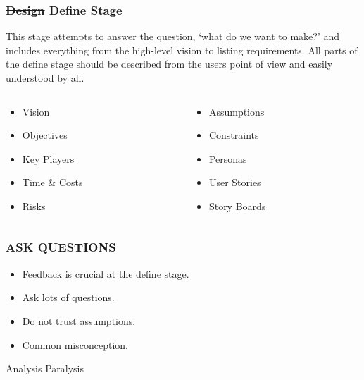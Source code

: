 \begin{frame}
	\frametitle{ \st{Design} Define Stage}
	This stage attempts to answer the question, `what do we want to make?' and includes everything from the high-level vision to listing requirements. All parts of the define stage should be described from the users point of view and easily understood by all. 
	\pause
	\begin{columns}
		\begin{column}{0.5\textwidth}
			\begin{itemize}
				\item Vision
				\item Objectives 
				\item Key Players				
				\item Time \& Costs
				\item Risks
			\end{itemize}
   		\end{column}
		
		\begin{column}{0.5\textwidth}  
			\begin{itemize}
				\item Assumptions
				\item Constraints
				\item Personas		
				\item User Stories
				\item Story Boards
			\end{itemize}
		\end{column}
	\end{columns}
\end{frame}

\begin{frame}
	\frametitle{\textbf{ASK QUESTIONS}}
	\begin{itemize}
		\item Feedback is crucial at the define stage. 
		\item Ask lots of questions.
		\item Do not trust assumptions. 
		\item Common misconception.
	\end{itemize}
\end{frame}

\begin{frame}
	\begin{center}
		\Huge{Analysis Paralysis }
	\end{center}
\end{frame}


